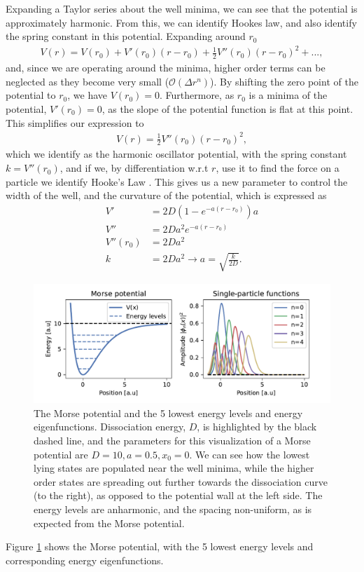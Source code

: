 \documentclass{subfiles}
\begin{document}
Expanding a Taylor series about the well minima, we can see that the potential is approximately harmonic. From this, we can identify Hookes law, and also identify the spring constant in this potential. Expanding around $r_0$
\begin{align*}
    V(r) = V(r_0) + V'(r_0)(r-r_0) + \frac{1}{2}V''(r_0)(r-r_0)^2 + ...,
\end{align*}
and, since we are operating around the minima, higher order terms can be neglected as they become very small ($\mathcal{O}(\Delta r^n)$). By shifting the zero point of the potential to $r_0$, we have $V(r_0) = 0$. Furthermore, as $r_0$ is a minima of the potential, $V'(r_0) = 0$, as the slope of the potential function is flat at this point. This simplifies our expression to
\begin{align*}
    V(r) = \frac{1}{2}V''(r_0)(r-r_0)^2,
\end{align*}
which we identify as the harmonic oscillator potential, with the spring constant $k = V''(r_0)$, and if we, by differentiation w.r.t $r$, use it to find the force on a particle we identify Hooke's Law \cite{piela2006ideas}. This gives us a new parameter to control the width of the well, and the curvature of the potential, which is expressed as
\begin{align*}
    V' &= 2D(1 - e^{-a(r-r_0)})a \\
    V'' &= 2Da^2e^{-a(r-r_0)} \\
    V''(r_0) &= 2Da^2 \\
    k &= 2Da^2 \rightarrow a = \sqrt{\frac{k}{2D}}.
\end{align*} 
\begin{figure}[h!]
    \centering
    \includegraphics[width=1.0\textwidth]{figs/potential_spf.pdf}
    \caption{The Morse potential and the 5 lowest energy levels and energy eigenfunctions. Dissociation energy, $D$, is highlighted by the black dashed line, and the parameters for this visualization of a Morse potential are $D=10, a=0.5, x_0=0$. We can see how the lowest lying states are populated near the well minima, while the higher order states are spreading out further towards the dissociation curve (to the right), as opposed to the potential wall at the left side. The energy levels are anharmonic, and the spacing non-uniform, as is expected from the Morse potential. }
    \label{fig:morse_potential}
\end{figure}
Figure \ref{fig:morse_potential} shows the Morse potential, with the 5 lowest energy levels and corresponding energy eigenfunctions. \\
\end{document}
